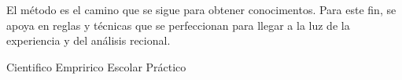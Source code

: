 
\question El método \fillin \enspace es el camino que se sigue para obtener
  conocimentos. Para este fin, se apoya en reglas y técnicas que
  se perfeccionan para llegar a la luz de la experiencia y del
  análisis recional.

  \begin{oneparchoices}
    \CorrectChoice Cientifico
    \choice Empririco
    \choice Escolar
    \choice Práctico
  \end{oneparchoices}
  \answerline[A]
